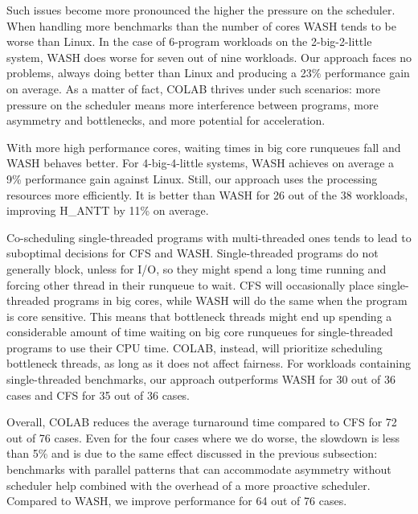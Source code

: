 Such issues become more pronounced the higher the pressure on the scheduler. When handling more benchmarks than the number of cores WASH tends to be worse than Linux. In the case of 6-program workloads on the 2-big-2-little system, WASH does worse for seven out of nine workloads. Our approach faces no problems, always doing better than Linux and producing a 23\% performance gain on average. As a matter of fact, COLAB thrives under such scenarios: more pressure on the scheduler means more interference between programs, more asymmetry and bottlenecks, and more potential for acceleration.

With more high performance cores, waiting times in big core runqueues fall and WASH behaves better. For 4-big-4-little systems, WASH achieves on average a 9\% performance gain against Linux. Still, our approach uses the processing resources more efficiently. It is better than WASH for 26 out of the 38 workloads, improving H\_ANTT by 11\% on average.

Co-scheduling single-threaded programs with multi-threaded ones tends to lead to suboptimal decisions for CFS and WASH. Single-threaded programs do not generally block, unless for I/O, so they might spend a long time running and forcing other thread in their runqueue to wait. CFS will occasionally place single-threaded programs in big cores, while WASH will do the same when the program is core sensitive. This means that bottleneck threads might end up spending a considerable amount of time waiting on big core runqueues for single-threaded programs to use their CPU time. COLAB, instead, will prioritize scheduling bottleneck threads, as long as it does not affect fairness. For workloads containing single-threaded benchmarks, our approach outperforms WASH for 30 out of 36 cases and CFS for 35 out of 36 cases. 

Overall, COLAB reduces the average turnaround time compared to CFS for 72 out of 76 cases. Even for the four cases where we do worse, the slowdown is less than 5\% and is due to the same effect discussed in the previous subsection: 
benchmarks with parallel patterns that can accommodate asymmetry without scheduler help combined with the overhead of a more proactive scheduler. Compared to WASH, we improve performance for 64 out of 76 cases.


